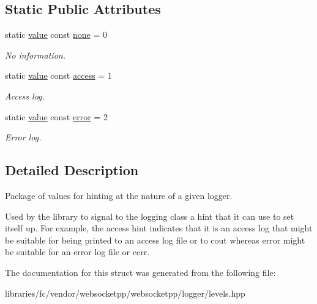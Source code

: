 \subsection*{Static Public Attributes}
\begin{DoxyCompactItemize}
\item 
\mbox{\label{structwebsocketpp_1_1log_1_1channel__type__hint_a2e7de3c97193085a20b7bb42815d23e2}} 
static \mbox{\hyperlink{structwebsocketpp_1_1log_1_1channel__type__hint_ad12a7f6555b71aabdc4cbec604dc89dd}{value}} const \mbox{\hyperlink{structwebsocketpp_1_1log_1_1channel__type__hint_a2e7de3c97193085a20b7bb42815d23e2}{none}} = 0
\begin{DoxyCompactList}\small\item\em No information. \end{DoxyCompactList}\item 
\mbox{\label{structwebsocketpp_1_1log_1_1channel__type__hint_a8c38587fffbffbfcfc35577734b0d653}} 
static \mbox{\hyperlink{structwebsocketpp_1_1log_1_1channel__type__hint_ad12a7f6555b71aabdc4cbec604dc89dd}{value}} const \mbox{\hyperlink{structwebsocketpp_1_1log_1_1channel__type__hint_a8c38587fffbffbfcfc35577734b0d653}{access}} = 1
\begin{DoxyCompactList}\small\item\em Access log. \end{DoxyCompactList}\item 
\mbox{\label{structwebsocketpp_1_1log_1_1channel__type__hint_a91473ac49fba696549da438483a6fe31}} 
static \mbox{\hyperlink{structwebsocketpp_1_1log_1_1channel__type__hint_ad12a7f6555b71aabdc4cbec604dc89dd}{value}} const \mbox{\hyperlink{structwebsocketpp_1_1log_1_1channel__type__hint_a91473ac49fba696549da438483a6fe31}{error}} = 2
\begin{DoxyCompactList}\small\item\em Error log. \end{DoxyCompactList}\end{DoxyCompactItemize}


\subsection{Detailed Description}
Package of values for hinting at the nature of a given logger. 

Used by the library to signal to the logging class a hint that it can use to set itself up. For example, the {\ttfamily access} hint indicates that it is an access log that might be suitable for being printed to an access log file or to cout whereas {\ttfamily error} might be suitable for an error log file or cerr. 

The documentation for this struct was generated from the following file\+:\begin{DoxyCompactItemize}
\item 
libraries/fc/vendor/websocketpp/websocketpp/logger/levels.\+hpp\end{DoxyCompactItemize}
